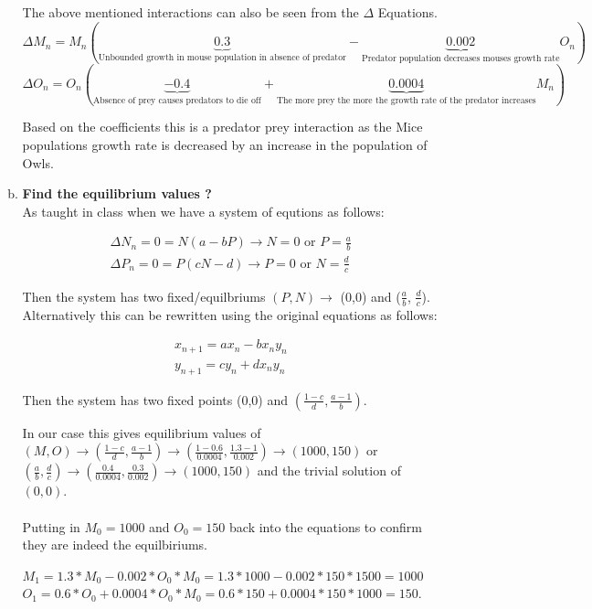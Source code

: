 \documentclass{article}
\begin{document}
\begin{enumerate}[1.]
\begin{enumerate}[(a)]
The above mentioned interactions can also be seen from the $\Delta$ Equations. \\
$\Delta M_n = M_n(\underbrace{0.3}_{\text{Unbounded growth in mouse population in absence of predator}} - \underbrace{0.002}_{\text{Predator population decreases mouses growth rate}}O_n) $\\
$\Delta O_n = O_n(\underbrace{-0.4}_{\text{Absence of prey causes predators to die off}} + \underbrace{0.0004}_{\text{The more prey the more the growth rate of the predator increases}}M_n)$

Based on the coefficients this is a predator prey interaction as the Mice populations growth rate is decreased by an increase in the population of Owls.
\item
\textbf{Find the equilibrium values ?} \\
As taught in class when we have a system of equtions as follows:

\begin{gather*}
\Delta N_n = 0 = N(a - bP) \to N = 0 \text{ or } P = \frac{a}{b} \\
\Delta P_n = 0 = P(cN - d) \to P = 0 \text{ or } N = \frac{d}{c}
\end{gather*}

Then the system has two fixed/equilbriums $(P,N) \to$ (0,0) and ($\frac{a}{b}$, $\frac{d}{c}$). Alternatively this can be rewritten using the original equations as follows:

\begin{gather*}
x_{n+1} = ax_n-bx_ny_n \\
y_{n+1} = cy_n + dx_ny_n
\end{gather*}

Then the system has two fixed points (0,0) and $(\frac{1-c}{d},\frac{a-1}{b})$. 

In our case this gives equilibrium values of $(M,O) \to (\frac{1-c}{d},\frac{a-1}{b}) \to (\frac{1 - 0.6}{0.0004}, \frac{1.3 - 1}{0.002}) \to (1000, 150)$ or $(\frac{a}{b}, \frac{d}{c}) \to (\frac{0.4}{0.0004}, \frac{0.3}{0.002}) \to (1000, 150)$ and the trivial solution of $(0,0)$.  \\ \\

Putting in $M_0 = 1000$ and $O_0 = 150$ back into the equations to confirm they are indeed the equilbiriums.

$M_1 = 1.3 * M_0 - 0.002 * O_0 * M_0 = 1.3 * 1000 - 0.002 * 150 * 1500 = 1000$ \\
$O_1 = 0.6 * O_0 + 0.0004 * O_0 * M_0 = 0.6 * 150 + 0.0004 * 150 * 1000 = 150$. \\


\end{enumerate}
\end{enumerate}
\end{document}
